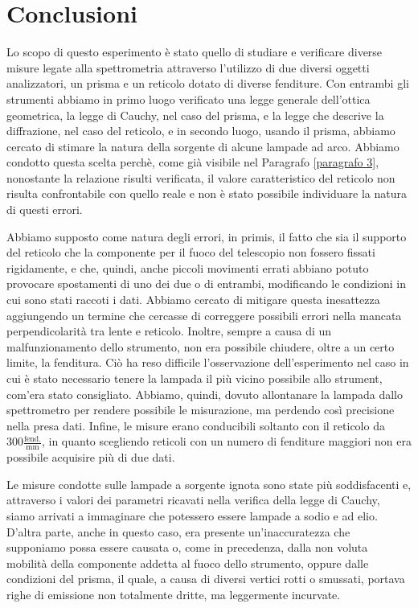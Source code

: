 \section{Conclusioni}
Lo scopo di questo esperimento è stato quello di studiare e verificare diverse misure legate alla spettrometria attraverso l’utilizzo di due diversi oggetti analizzatori, un prisma e un reticolo dotato di diverse fenditure. Con entrambi gli strumenti abbiamo in primo luogo verificato una legge generale dell’ottica geometrica, la legge di Cauchy, nel caso del prisma, e la legge che descrive la diffrazione, nel caso del reticolo, e in secondo luogo, usando il prisma, abbiamo cercato di stimare la natura della sorgente di alcune lampade ad arco. Abbiamo condotto questa scelta perchè, come già visibile nel Paragrafo \ref{paragrafo 3}, nonostante la relazione risulti verificata, il valore caratteristico del reticolo non risulta confrontabile con quello reale e non è stato possibile individuare la natura di questi errori.

Abbiamo supposto come natura degli errori, in primis, il fatto che sia il supporto del reticolo che la componente per il fuoco del telescopio non fossero fissati rigidamente, e che, quindi, anche piccoli movimenti errati abbiano potuto provocare spostamenti di uno dei due o di entrambi, modificando le condizioni in cui sono stati raccoti i dati. Abbiamo cercato di mitigare questa inesattezza aggiungendo un termine che cercasse di correggere possibili errori nella mancata perpendicolarità tra lente e reticolo. Inoltre, sempre a causa di un malfunzionamento dello strumento, non era possibile chiudere, oltre a un certo limite, la fenditura. Ciò ha reso difficile l’osservazione dell’esperimento nel caso in cui è stato necessario tenere la lampada il più vicino possibile allo strument, com’era stato consigliato. Abbiamo, quindi, dovuto allontanare la lampada dallo spettrometro per rendere possibile le misurazione, ma perdendo così precisione nella  presa dati. Infine, le misure erano conducibili soltanto con il reticolo da $300 \frac{\text{fend.}}{\text{mm}}$, in quanto scegliendo reticoli con un numero di fenditure maggiori non era possibile acquisire più di due dati. 

Le misure condotte sulle lampade a sorgente ignota sono state più soddisfacenti e, attraverso i valori dei parametri ricavati nella verifica della legge di Cauchy, siamo arrivati a immaginare che potessero essere lampade a sodio e ad elio. D'altra parte, anche in questo caso, era presente un'inaccuratezza che supponiamo possa essere causata o, come in precedenza, dalla non voluta mobilità della componente addetta al fuoco dello strumento, oppure dalle condizioni del prisma, il quale, a causa di diversi vertici rotti o smussati, portava righe di emissione non totalmente dritte, ma leggermente incurvate. 

